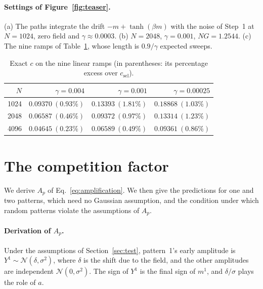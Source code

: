 \documentclass[final]{dynafront2026}
\begin{document}
\paragraph{Settings of Figure~\ref{fig:teaser}.}
(a) The paths integrate the drift $-m+\tanh(\beta m)$ with the noise of
Step~1 at $N=1024$, zero field and $\gamma\approx0.0003$. (b) $N=2048$, $\gamma=0.001$, $NG=1.2544$. (c) The nine
ramps of Table~\ref{tab:linear}, whose length is $0.9/\gamma$ expected
sweeps.

\begin{table}[!htb]
 \centering
 \caption{Exact $c$ on the nine linear ramps (in parentheses: its percentage excess over
 $c_{\mathrm{sel}}$).}
 \label{tab:linear}
 \begin{tabular}{rrrr}
 \toprule
 $N$ & $\gamma=0.004$ & $\gamma=0.001$ & $\gamma=0.00025$\\
 \midrule
 1024 & $0.09370\ (0.93\%)$ & $0.13393\ (1.81\%)$ & $0.18868\ (1.03\%)$\\
 2048 & $0.06587\ (0.46\%)$ & $0.09372\ (0.97\%)$ & $0.13314\ (1.23\%)$\\
 4096 & $0.04645\ (0.23\%)$ & $0.06589\ (0.49\%)$ & $0.09361\ (0.86\%)$\\
 \bottomrule
 \end{tabular}
\end{table}

\section{The competition factor}
\label{app:amplification}

We derive $A_p$ of Eq.~\eqref{eq:amplification}. We then give the
predictions for one and two patterns, which need no Gaussian assumption, and
the condition under which random patterns violate the assumptions of $A_p$.

\paragraph{Derivation of $A_p$.}
Under the assumptions of Section~\ref{sec:test}, pattern~1's early amplitude
is $Y^1\sim\mathcal N(\delta,\sigma^2)$, where $\delta$ is the shift due to
the field, and the other amplitudes are independent
$\mathcal N(0,\sigma^2)$. The sign of $Y^1$ is the final sign of $m^1$, and
$\delta/\sigma$ plays the role of $a$.
\end{document}
